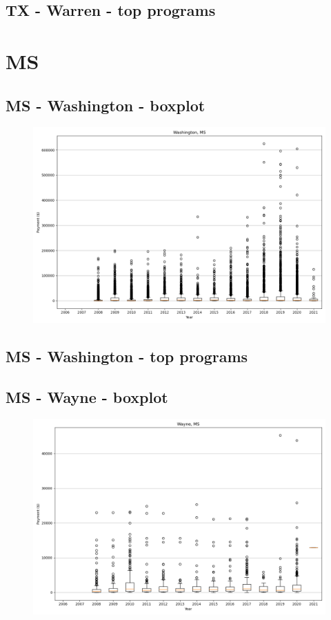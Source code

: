 \subsection*{TX - Warren - top programs}

\newpage
\section*{MS}
\subsection*{MS - Washington - boxplot}
\begin{figure}[h]
\centering
\includegraphics[width=7in]{../output/boxplots/counties/Washington-MS_boxplot.png}
\end{figure}


\subsection*{MS - Washington - top programs}

\newpage
\subsection*{MS - Wayne - boxplot}
\begin{figure}[h]
\centering
\includegraphics[width=7in]{../output/boxplots/counties/Wayne-MS_boxplot.png}
\end{figure}


